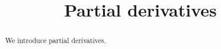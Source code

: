 \documentclass{ximera}
\title[Dig-In:]{Partial derivatives}
\begin{document}
\begin{abstract}
We introduce partial derivatives.
\end{abstract}
\maketitle
\end{document}
